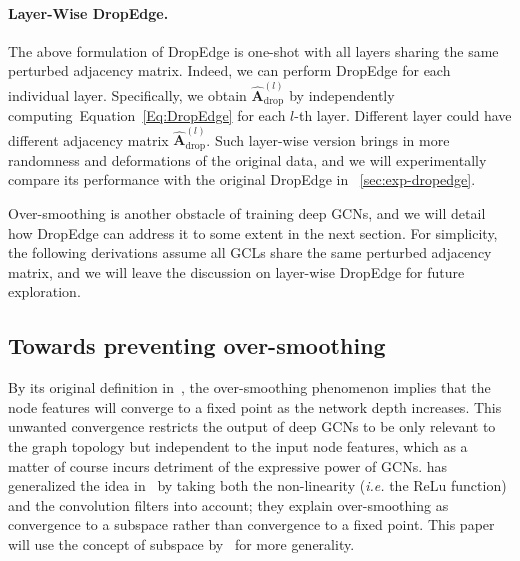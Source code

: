 \documentclass{article}
\def\Eqref#1{Equation~\ref{#1}}
\def\mA{{\bm{A}}}
\begin{document}
\paragraph{Layer-Wise DropEdge.}
The above formulation of DropEdge is one-shot with all layers sharing the same perturbed adjacency matrix. Indeed, we can perform DropEdge for each individual layer. Specifically, we obtain $\hat{\mA}_{\text{drop}}^{(l)}$ by independently computing~\Eqref{Eq:DropEdge} for each $l$-th layer. Different layer could have different adjacency matrix $\hat{\mA}_{\text{drop}}^{(l)}$. Such layer-wise version brings in more randomness and deformations of the original data, and we will experimentally compare its performance with the original DropEdge in \textsection~\ref{sec:exp-dropedge}.

Over-smoothing is another obstacle of training deep GCNs, and we will detail how DropEdge can address it to some extent in the next section. For simplicity, the following derivations assume all GCLs share the same perturbed adjacency matrix, and we will leave the discussion on layer-wise DropEdge for future exploration.


\subsection{Towards preventing over-smoothing}
\label{sec:over-smoothing}
By its original definition in~\citet{Li2018}, the over-smoothing phenomenon implies that the node features will converge to a fixed point as the network depth increases. This unwanted convergence restricts the output of deep GCNs to be only relevant to the graph topology but independent to the input node features, which as a matter of course incurs detriment of the expressive power of GCNs. \citet{oono2019asymptotic} has generalized the idea in~\citet{Li2018} by taking both the non-linearity (\emph{i.e.} the ReLu function) and the convolution filters into account; they explain over-smoothing as convergence to a subspace rather than convergence to a fixed point. This paper will use the concept of subspace by~\citet{oono2019asymptotic} for more generality.
\end{document}
